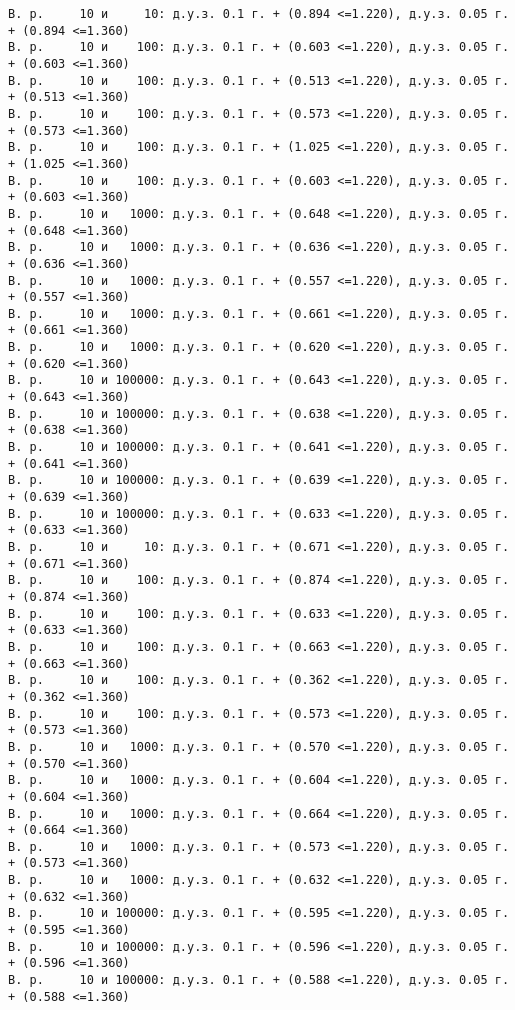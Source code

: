 \documentclass[11pt]{article}
\begin{document}
{\begin{Verbatim}[commandchars=\\\{\}]
В. р.     10 и     10: д.у.з. 0.1 г. + (0.894 <=1.220), д.у.з. 0.05 г. + (0.894 <=1.360)
В. р.     10 и    100: д.у.з. 0.1 г. + (0.603 <=1.220), д.у.з. 0.05 г. + (0.603 <=1.360)
В. р.     10 и    100: д.у.з. 0.1 г. + (0.513 <=1.220), д.у.з. 0.05 г. + (0.513 <=1.360)
В. р.     10 и    100: д.у.з. 0.1 г. + (0.573 <=1.220), д.у.з. 0.05 г. + (0.573 <=1.360)
В. р.     10 и    100: д.у.з. 0.1 г. + (1.025 <=1.220), д.у.з. 0.05 г. + (1.025 <=1.360)
В. р.     10 и    100: д.у.з. 0.1 г. + (0.603 <=1.220), д.у.з. 0.05 г. + (0.603 <=1.360)
В. р.     10 и   1000: д.у.з. 0.1 г. + (0.648 <=1.220), д.у.з. 0.05 г. + (0.648 <=1.360)
В. р.     10 и   1000: д.у.з. 0.1 г. + (0.636 <=1.220), д.у.з. 0.05 г. + (0.636 <=1.360)
В. р.     10 и   1000: д.у.з. 0.1 г. + (0.557 <=1.220), д.у.з. 0.05 г. + (0.557 <=1.360)
В. р.     10 и   1000: д.у.з. 0.1 г. + (0.661 <=1.220), д.у.з. 0.05 г. + (0.661 <=1.360)
В. р.     10 и   1000: д.у.з. 0.1 г. + (0.620 <=1.220), д.у.з. 0.05 г. + (0.620 <=1.360)
В. р.     10 и 100000: д.у.з. 0.1 г. + (0.643 <=1.220), д.у.з. 0.05 г. + (0.643 <=1.360)
В. р.     10 и 100000: д.у.з. 0.1 г. + (0.638 <=1.220), д.у.з. 0.05 г. + (0.638 <=1.360)
В. р.     10 и 100000: д.у.з. 0.1 г. + (0.641 <=1.220), д.у.з. 0.05 г. + (0.641 <=1.360)
В. р.     10 и 100000: д.у.з. 0.1 г. + (0.639 <=1.220), д.у.з. 0.05 г. + (0.639 <=1.360)
В. р.     10 и 100000: д.у.з. 0.1 г. + (0.633 <=1.220), д.у.з. 0.05 г. + (0.633 <=1.360)
В. р.     10 и     10: д.у.з. 0.1 г. + (0.671 <=1.220), д.у.з. 0.05 г. + (0.671 <=1.360)
В. р.     10 и    100: д.у.з. 0.1 г. + (0.874 <=1.220), д.у.з. 0.05 г. + (0.874 <=1.360)
В. р.     10 и    100: д.у.з. 0.1 г. + (0.633 <=1.220), д.у.з. 0.05 г. + (0.633 <=1.360)
В. р.     10 и    100: д.у.з. 0.1 г. + (0.663 <=1.220), д.у.з. 0.05 г. + (0.663 <=1.360)
В. р.     10 и    100: д.у.з. 0.1 г. + (0.362 <=1.220), д.у.з. 0.05 г. + (0.362 <=1.360)
В. р.     10 и    100: д.у.з. 0.1 г. + (0.573 <=1.220), д.у.з. 0.05 г. + (0.573 <=1.360)
В. р.     10 и   1000: д.у.з. 0.1 г. + (0.570 <=1.220), д.у.з. 0.05 г. + (0.570 <=1.360)
В. р.     10 и   1000: д.у.з. 0.1 г. + (0.604 <=1.220), д.у.з. 0.05 г. + (0.604 <=1.360)
В. р.     10 и   1000: д.у.з. 0.1 г. + (0.664 <=1.220), д.у.з. 0.05 г. + (0.664 <=1.360)
В. р.     10 и   1000: д.у.з. 0.1 г. + (0.573 <=1.220), д.у.з. 0.05 г. + (0.573 <=1.360)
В. р.     10 и   1000: д.у.з. 0.1 г. + (0.632 <=1.220), д.у.з. 0.05 г. + (0.632 <=1.360)
В. р.     10 и 100000: д.у.з. 0.1 г. + (0.595 <=1.220), д.у.з. 0.05 г. + (0.595 <=1.360)
В. р.     10 и 100000: д.у.з. 0.1 г. + (0.596 <=1.220), д.у.з. 0.05 г. + (0.596 <=1.360)
В. р.     10 и 100000: д.у.з. 0.1 г. + (0.588 <=1.220), д.у.з. 0.05 г. + (0.588 <=1.360)

\end{Verbatim}}
\end{document}

